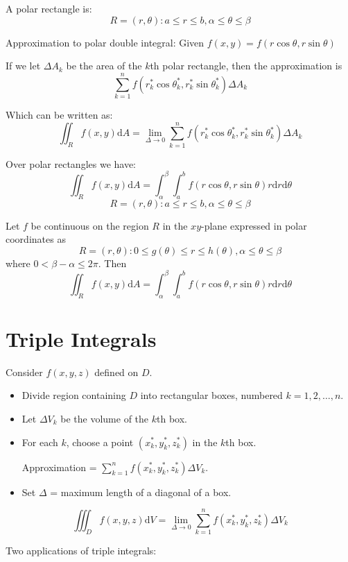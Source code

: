 \documentclass[../calc3.tex]{subfiles}
\begin{document}
A polar rectangle is:
\[R={(r, \theta) : a\leq r\leq b, \alpha \leq \theta \leq \beta}\]

Approximation to polar double integral:
Given $f(x,y) = f(r\cos \theta, r\sin\theta)$

If we let $\Delta A_k$ be the area of the $k$th polar rectangle, then the approximation is
\[\sum^n_{k=1}f(r^*_k\cos\theta_k^*, r_k^*\sin\theta_k^*)\Delta A_k\]

Which can be written as:
\[\iint_R f(x,y)\mathrm{d}A = \lim_{\Delta \to 0}\sum^n_{k=1}f(r_k^*\cos\theta_k^*, r_k^*\sin\theta_k^*)\Delta A_k\]

Over polar rectangles we have:
\[\iint_R f(x,y)\mathrm{d}A = \int^{\beta}_{\alpha}\int^b_a f(r\cos\theta, r\sin\theta)r\mathrm{d}r\mathrm{d}\theta\] 
\[R={(r,\theta) : a\leq r\leq b, \alpha\leq \theta\leq \beta}\]

\begin{theorem}
    Let $f$ be continuous on the region $R$ in the $xy$-plane expressed in polar coordinates as 
    \[R = {(r,\theta): 0\leq g(\theta) \leq r  \leq h(\theta), \alpha \leq \theta \leq \beta}\]
    where $0<\beta - \alpha \leq 2\pi$. Then 
    \[\iint_R f(x,y)\mathrm{d}A = \int^{\beta}_{\alpha}\int^b_a f(r\cos\theta, r\sin\theta)r\mathrm{d}r\mathrm{d}\theta\] 

\end{theorem}


\section{Triple Integrals}
Consider $f(x,y,z)$ defined on $D$.
\begin{itemize}
    \item Divide region containing $D$ into rectangular boxes, numbered $k=1,2,\dots,n$.
    \item Let $\Delta V_k$ be the volume of the $k$th box.
    \item For each $k$, choose a point $(x^*_k, y^*_k, z^*_k)$ in the $k$th box.
    
    Approximation = $\sum^n_{k=1}f(x^*_k,y^*_k,z^*_k)\Delta V_k$.
    \item Set $\Delta$ = maximum length of a diagonal of a box.
\end{itemize}

\[\iiint_D f(x,y,z)\mathrm{d}V=\lim_{\Delta \to 0}\sum^n_{k=1}f(x_k^*,y_k^*,z_k^*)\Delta V_k\]

Two applications of triple integrals:
\end{document}
